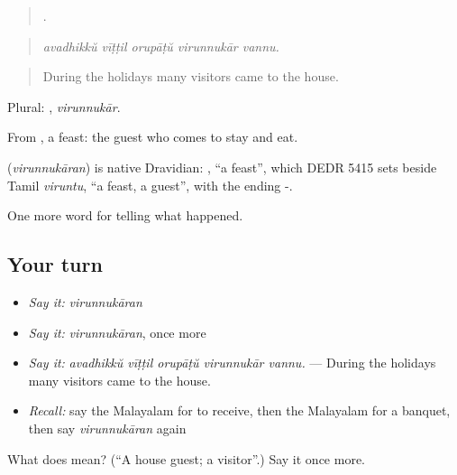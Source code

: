 \begin{quote}
    .
\end{quote}

\begin{quote}
\emph{avadhikkŭ vīṭṭil orupāṭŭ virunnukār vannu.}
\end{quote}

\begin{quote}
During the holidays many visitors came to the house.
\end{quote}

Plural: , \emph{virunnukār}.

From , a feast: the guest who comes to stay and eat.

\begin{cousinweb}
\textbf{} (\emph{virunnukāran}) is native Dravidian: , \textquotedblleft{}a feast\textquotedblright{}, which DEDR 5415 sets beside Tamil \emph{viruntu}, \textquotedblleft{}a feast, a guest\textquotedblright{}, with the ending -.
\end{cousinweb}

\begin{grammarlens}[title={What you've built}]
One more word for telling what happened.
\end{grammarlens}

\subsection*{Your turn}
\begin{itemize}
\raggedright
  \item \emph{Say it:} \emph{virunnukāran}
  \item \emph{Say it:} \emph{virunnukāran}, once more
  \item \emph{Say it:} \emph{avadhikkŭ vīṭṭil orupāṭŭ virunnukār vannu.} — During the holidays many visitors came to the house.
  \item \emph{Recall:} say the Malayalam for to receive, then the Malayalam for a banquet, then say \emph{virunnukāran} again
\end{itemize}

\begin{tcolorbox}[breakable,colback=teal!4,colframe=teal!35!black,title={Before you move on}]
What does  mean? (\textquotedblleft{}A house guest; a visitor\textquotedblright{}.) Say it once more.
\end{tcolorbox}
